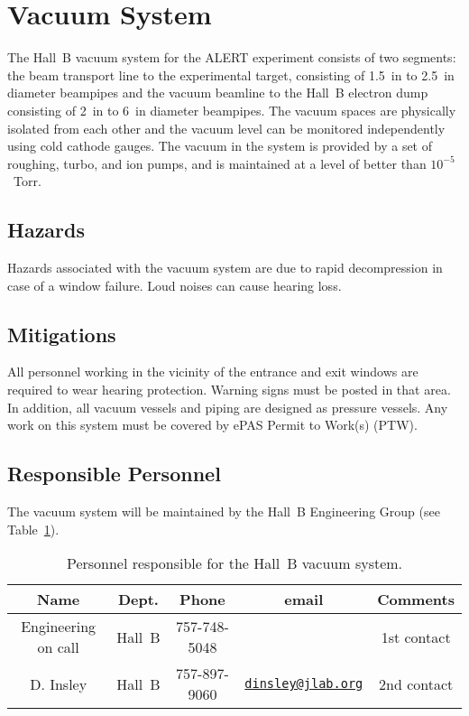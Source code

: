 \section{Vacuum System}

The Hall~B vacuum system for the ALERT experiment consists of two segments: the beam
transport line to the experimental target, consisting of 1.5~in to 2.5~in diameter
beampipes and the vacuum beamline to the Hall~B electron dump consisting of 
2~in to 6~in diameter beampipes. The vacuum spaces are physically isolated from each
other and the vacuum level can be monitored independently using cold cathode gauges. The
vacuum in the system is provided by a set of roughing, turbo, and ion pumps, and is
maintained at a level of better than $10^{-5}$~Torr. 

\subsection{Hazards} 

Hazards associated with the vacuum system are due to rapid decompression in case of a window 
failure. Loud noises can cause hearing loss. 

\subsection{Mitigations}

All personnel working in the vicinity of the entrance and exit windows are required to wear 
hearing protection. Warning signs must be posted in that area. In addition, all vacuum vessels 
and piping are designed as pressure vessels.  Any work on this system must be covered by ePAS
Permit to Work(s) (PTW).

\subsection{Responsible Personnel}

The vacuum system will be maintained by the Hall~B Engineering Group (see
Table~\ref{tb:vacuum}).  

\begin{table}[!htb]
\centering
\begin{tabular}{|c|c|c|c|c|} \hline
Name&Dept.&Phone&email&Comments \\ \hline
Engineering on call & Hall~B& 757-748-5048&& 1st contact  \\ \hline
D. Insley & Hall~B  &757-897-9060&\href{mailto:dinsley@jlab.org}{\nolinkurl{dinsley@jlab.org}}  &2nd contact \\ \hline
 \end{tabular}
\caption{Personnel responsible for the Hall~B vacuum system.} 
\label{tb:vacuum}
\end{table}

